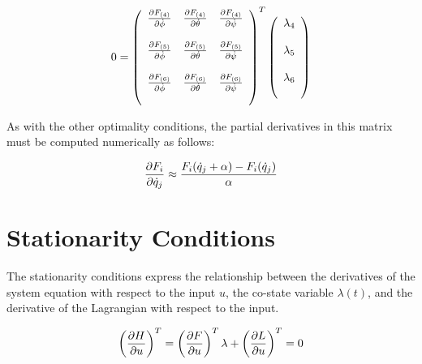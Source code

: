 \begin{equation}
    0 = \left(
    \begin{array}{c c c }

    \frac{\partial F_{(4)}}{\partial \dot \phi} & \frac{\partial F_{(4)}}{\partial \dot \theta} & \frac{\partial F_{(4)}}{\partial \dot \psi}\\\\

    \frac{\partial F_{(5)}}{\partial \dot \phi} & \frac{\partial F_{(5)}}{\partial \dot \theta} & \frac{\partial F_{(5)}}{\partial \dot \psi}\\\\

     \frac{\partial F_{(6)}}{\partial \dot \phi} & \frac{\partial F_{(6)}}{\partial \dot \theta} & \frac{\partial F_{(6)}}{\partial \dot \psi}\\\\

    \end{array}\right)^T\left(
    \begin{array}{c}
    \lambda_4\\\\
    \lambda_5\\\\
    \lambda_6\\\\
    \end{array}\right)
\end{equation}

As with the other optimality conditions, the partial derivatives in this matrix must be computed numerically as follows:

\begin{equation}
    \frac{\partial F_i}{\partial \dot q_j} \approx \frac{ F_i(\dot q_j + \alpha) - F_i(\dot q_j)  }{\alpha}
\end{equation}



\section{Stationarity Conditions}

The stationarity conditions express the relationship between the derivatives of the system equation with respect to the input $u$, the co-state variable $\lambda(t)$, and the derivative of the Lagrangian with respect to the input.

\begin{equation}
    \left(\frac{\partial H}{\partial u}\right)^T = \left(\frac{\partial F}{\partial u}\right)^T \lambda + \left(\frac{\partial L}{\partial u}\right)^T = 0
\end{equation}


